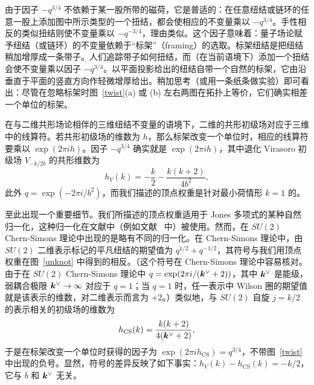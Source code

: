 由于因子 $-q^{3/4}$ 不依赖于某一股所带的磁荷，它是普适的：在任意纽结或链环的任意一股上添加图中所示类型的一个扭结，都会使相应的不变量乘以 $-q^{3/4}$。手性相反的类似扭结则使不变量乘以 $-q^{-3/4}$，理由类似。这个因子意味着：量子场论赋予纽结（或链环）的不变量依赖于“标架”（framing）的选取。标架纽结是把纽结稍加增厚成一条带子。人们追踪带子如何扭结，而（在当前语境下）添加一个扭结会使不变量乘以因子 $-q^{3/4}$。以平面投影给出的纽结自带一个自然的标架，它由沿垂直于平面的竖直方向作轻微增厚给出。稍加思考（或用一条纸条做实验）即可看出：尽管在忽略标架时图~\ref{twist}(a) 或 (b) 左右两图在拓扑上等价，它们确实相差一个单位的标架。


在与二维共形场论相伴的三维纽结不变量的语境下，二维的共形初级场对应于三维中的线算符。若共形初级场的维数为 $h$，那么标架改变一个单位时，相应的线算符要乘以 $\exp(2\pi i h)$。因子 $-q^{3/4}$ 确实就是 $\exp(2\pi i h)$，其中退化 Virasoro 初级场 $V_{-k/2b}$ 的共形维数为
\begin{equation}\label{maxi} h_V(k) =-\frac{k}{2}-\frac{k(k+2)}{4b^2},\end{equation}
此外 $q=\exp(-2\pi i/b^2)$，而我们描述的顶点权重是针对最小荷情形 $k=1$ 的。


至此出现一个重要细节。我们所描述的顶点权重适用于 Jones 多项式的某种自然归一化，这种归一化在文献中（例如文献~\cite{Kauffman} 中）被使用。然而，在 $SU(2)$ Chern-Simons 理论中出现的是略有不同的归一化。在 Chern-Simons 理论中，由 $SU(2)$ 二维表示标记的平凡纽结的期望值为 $q^{1/2}+q^{-1/2}$，其符号与我们用顶点权重在图~\ref{unknot} 中得到的相反。（这个符号在 Chern-Simons 理论中容易核对。由于在 $SU(2)$ Chern-Simons 理论中 $q=\exp(2\pi i/({\boldsymbol{k}}^\vee+2))$，其中 ${\boldsymbol{k}}^\vee$ 是能级，弱耦合极限 ${\boldsymbol{k}}^\vee\to\infty$ 对应于 $q=1$；当 $q=1$ 时，任一表示中 Wilson 圈的期望值就是该表示的维数，对二维表示而言为 $+2$。）类似地，与 $SU(2)$ 自旋 $j=k/2$ 的表示相关的初级场的维数为
\begin{equation}h_{\mathrm{CS}} (k)=\frac{k(k+2)}{4({\boldsymbol{k}}^\vee+2)},\end{equation}
于是在标架改变一个单位时获得的因子为 $\exp(2\pi ih_{\mathrm{CS}})=q^{3/4}$，不带图~\ref{twist} 中出现的负号。显然，符号的差异反映了如下事实：$h_V(k)-h_{\mathrm{CS}}(k)=-k/2$，它与 $b$ 和 ${\boldsymbol{k}}^\vee$ 无关。

